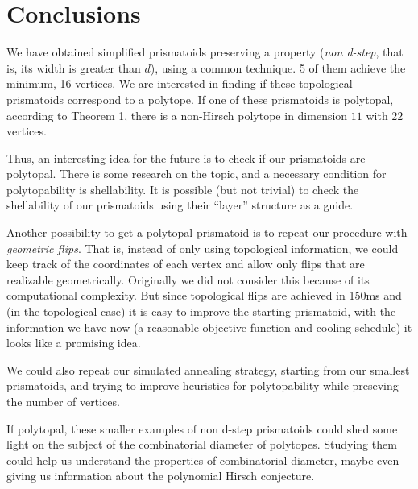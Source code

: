 \documentclass[12pt,a4paper]{article}
\theoremstyle{plain}
\theoremstyle{definition}
\begin{document}
\section{Conclusions}
We have obtained simplified prismatoids preserving a property (\emph{non d-step}, that is, its width is greater than $d$), using a common technique. 5 of them achieve the minimum, 16 vertices. We are interested in finding if these topological prismatoids correspond to a polytope. If one of these prismatoids is polytopal, according to Theorem 1, there is a non-Hirsch polytope in dimension $11$ with $22$ vertices.

Thus, an interesting idea for the future is to check if our prismatoids are polytopal. There is some research on the topic, and a necessary condition for polytopability is shellability. It is possible (but not trivial) to check the shellability of our prismatoids using their ``layer'' structure as a guide.

Another possibility to get a polytopal prismatoid is to repeat our procedure with \emph{geometric flips}. That is, instead of only using topological information, we could keep track of the coordinates of each vertex and allow only flips that are realizable geometrically. Originally we did not consider this because of its computational complexity. But since topological flips are achieved in 150ms and (in the topological case) it is easy to improve the starting prismatoid, with the information we have now (a reasonable objective function and cooling schedule) it looks like a promising idea.

We could also repeat our simulated annealing strategy, starting from our smallest prismatoids, and trying to improve heuristics for polytopability while preseving the number of vertices.

If polytopal, these smaller examples of non d-step prismatoids could shed some light on the subject of the combinatorial diameter of polytopes. Studying them could help us understand the properties of combinatorial diameter, maybe even giving us information about the polynomial Hirsch conjecture.
\end{document}
